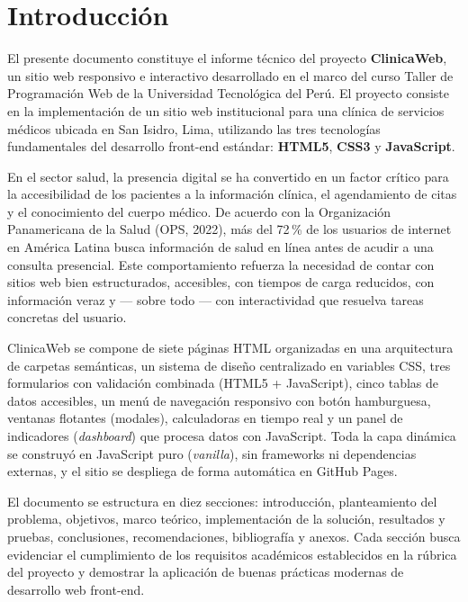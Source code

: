 \documentclass[11pt,a4paper]{article}
\begin{document}
\tableofcontents
\newpage

\section{Introducción}

El presente documento constituye el informe técnico del proyecto \textbf{ClinicaWeb}, un sitio web responsivo e interactivo desarrollado en el marco del curso Taller de Programación Web de la Universidad Tecnológica del Perú. El proyecto consiste en la implementación de un sitio web institucional para una clínica de servicios médicos ubicada en San Isidro, Lima, utilizando las tres tecnologías fundamentales del desarrollo front-end estándar: \textbf{HTML5}, \textbf{CSS3} y \textbf{JavaScript}.

En el sector salud, la presencia digital se ha convertido en un factor crítico para la accesibilidad de los pacientes a la información clínica, el agendamiento de citas y el conocimiento del cuerpo médico. De acuerdo con la Organización Panamericana de la Salud (OPS, 2022), más del 72\,\% de los usuarios de internet en América Latina busca información de salud en línea antes de acudir a una consulta presencial. Este comportamiento refuerza la necesidad de contar con sitios web bien estructurados, accesibles, con tiempos de carga reducidos, con información veraz y --- sobre todo --- con interactividad que resuelva tareas concretas del usuario.

ClinicaWeb se compone de siete páginas HTML organizadas en una arquitectura de carpetas semánticas, un sistema de diseño centralizado en variables CSS, tres formularios con validación combinada (HTML5 + JavaScript), cinco tablas de datos accesibles, un menú de navegación responsivo con botón hamburguesa, ventanas flotantes (modales), calculadoras en tiempo real y un panel de indicadores (\emph{dashboard}) que procesa datos con JavaScript. Toda la capa dinámica se construyó en JavaScript puro (\emph{vanilla}), sin frameworks ni dependencias externas, y el sitio se despliega de forma automática en GitHub Pages.

El documento se estructura en diez secciones: introducción, planteamiento del problema, objetivos, marco teórico, implementación de la solución, resultados y pruebas, conclusiones, recomendaciones, bibliografía y anexos. Cada sección busca evidenciar el cumplimiento de los requisitos académicos establecidos en la rúbrica del proyecto y demostrar la aplicación de buenas prácticas modernas de desarrollo web front-end.
\end{document}
